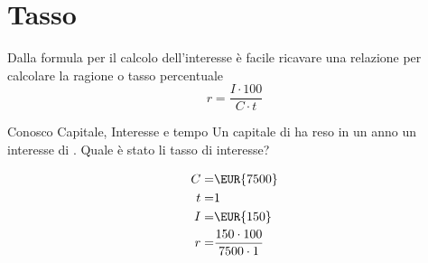 \section{Tasso}
Dalla formula per il calcolo dell'interesse è facile ricavare una relazione per calcolare la ragione o tasso percentuale
\[r=\dfrac{I\cdot 100}{C\cdot t}\]
	\begin{esempiot}{Conosco Capitale, Interesse e tempo}{}
	Un capitale di  ha reso in un anno un interesse di . Quale è stato li tasso di interesse?
\end{esempiot}
\begin{align*}
	C=&\mbox{\EUR{7500}}\\
	t=&1\\
	I=&\mbox{\EUR{150}}\\
	r=&\dfrac{150\cdot 100}{7500\cdot 1}\\
\end{align*}